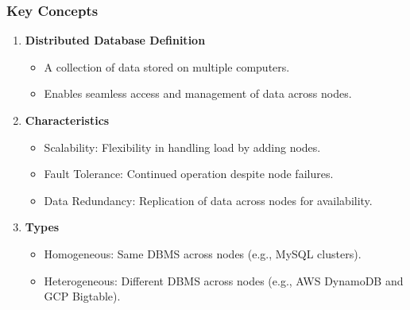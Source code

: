 \documentclass[aspectratio=169]{beamer}
\begin{document}
\begin{frame}
    \frametitle{Key Concepts}
    \begin{enumerate}
        \item \textbf{Distributed Database Definition}
        \begin{itemize}
            \item A collection of data stored on multiple computers.
            \item Enables seamless access and management of data across nodes.
        \end{itemize}
        
        \item \textbf{Characteristics}
        \begin{itemize}
            \item Scalability: Flexibility in handling load by adding nodes.
            \item Fault Tolerance: Continued operation despite node failures.
            \item Data Redundancy: Replication of data across nodes for availability.
        \end{itemize}
        
        \item \textbf{Types}
        \begin{itemize}
            \item Homogeneous: Same DBMS across nodes (e.g., MySQL clusters).
            \item Heterogeneous: Different DBMS across nodes (e.g., AWS DynamoDB and GCP Bigtable).
        \end{itemize}
    \end{enumerate}
\end{frame}
\end{document}
